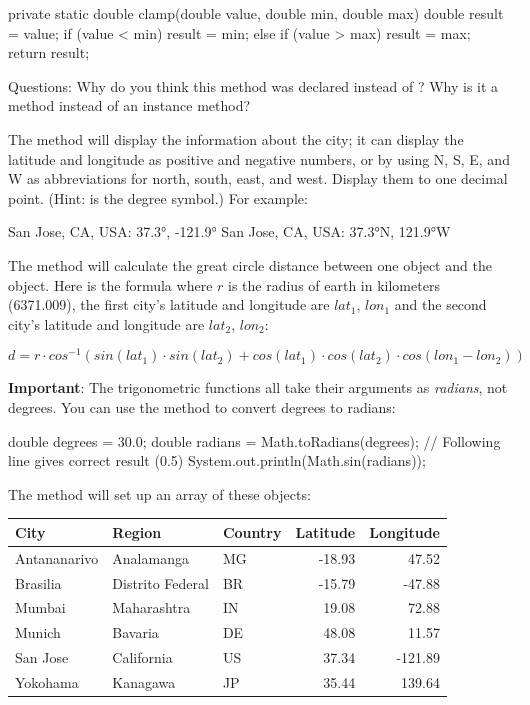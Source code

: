 \begin{exercise}
\begin{code}
private static double clamp(double value, double min, double max) {
    double result = value;
    if (value <  min) {
        result = min;
    }
    else if (value > max) {
        result = max;
    }
    return result;
}
\end{code}


Questions: Why do you think this method was declared  instead of ? Why is it a  method instead of an instance method?

The  method will display the information about the city; it can display the latitude and longitude as positive and negative numbers, or by using N, S, E, and W as abbreviations for north, south, east, and west. Display them to one decimal point. (Hint:  is the degree symbol.) For example:

\begin{stdout}
San Jose, CA, USA: 37.3°, -121.9°
San Jose, CA, USA: 37.3°N, 121.9°W
\end{stdout}


The  method will calculate the great circle distance between one  object and the   object. Here is the formula where $r$ is the radius of earth in kilometers (6371.009), the first city's latitude and longitude are $lat_1$, $lon_1$ and the second city's latitude and longitude are  $lat_2$, $lon_2$:

\begin{equation*}
d = r\cdot cos^{-1}(sin(lat_1)\cdot sin(lat_2) + cos(lat_1)\cdot cos(lat_2)\cdot cos(lon_1 - lon_2))
\end{equation*}

{\bf Important}: The trigonometric functions all take their arguments as {\em radians}, not degrees. You can use the  method to convert degrees to radians:

\begin{code}
double degrees = 30.0;
double radians = Math.toRadians(degrees);
// Following line gives correct result (0.5)
System.out.println(Math.sin(radians));
\end{code}

The  method will set up an array of these  objects:

\begin{tabular}{|l|l|l|r|r|}
\hline
City & Region & Country & Latitude & Longitude \\ \hline
Antananarivo & Analamanga & MG & -18.93 & 47.52 \\ \hline
Brasilia & Distrito Federal & BR & -15.79 & -47.88 \\ \hline
Mumbai & Maharashtra & IN & 19.08 & 72.88 \\ \hline
Munich & Bavaria & DE & 48.08 & 11.57 \\ \hline
San Jose & California & US & 37.34 & -121.89 \\ \hline
Yokohama & Kanagawa & JP & 35.44 & 139.64 \\ \hline
\end{tabular}


\end{exercise}
